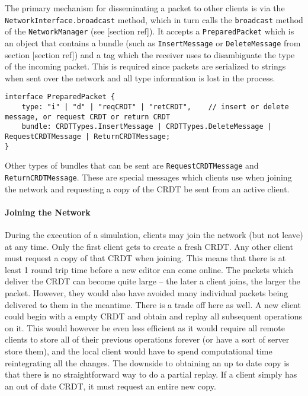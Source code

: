 \documentclass[12pt,a4paper,twoside,openright]{report}
\begin{document}
		The primary mechanism for disseminating a packet to other clients is via the \lstinline|NetworkInterface.broadcast| method, which in turn calls the \lstinline|broadcast| method of the \lstinline|NetworkManager| (see [section ref]). It accepts a \lstinline|PreparedPacket| which is an object that contains a bundle (such as \lstinline|InsertMessage| or \lstinline|DeleteMessage| from section [section ref]) and a tag which the receiver uses to disambiguate the type of the incoming packet. This is required since packets are serialized to strings when sent over the network and all type information is lost in the process.
\begin{lstlisting}	
interface PreparedPacket {
	type: "i" | "d" | "reqCRDT" | "retCRDT",    // insert or delete message, or request CRDT or return CRDT
	bundle: CRDTTypes.InsertMessage | CRDTTypes.DeleteMessage | RequestCRDTMessage | ReturnCRDTMessage;
}
\end{lstlisting}
		
		Other types of bundles that can be sent are \lstinline|RequestCRDTMessage| and \lstinline|ReturnCRDTMessage|. These are special messages which clients use when joining the network and requesting a copy of the CRDT be sent from an active client.
		
		\paragraph{Joining the Network}
		During the execution of a simulation, clients may join the network (but not leave) at any time. Only the first client gets to create a fresh CRDT. Any other client must request a copy of that CRDT when joining. This means that there is at least 1 round trip time before a new editor can come online. The packets which deliver the CRDT can become quite large -- the later a client joins, the larger the packet. However, they would also have avoided many individual packets being delivered to them in the meantime. There is a trade off here as well. A new client could begin with a empty CRDT and obtain and replay all subsequent operations on it. This would however be even less efficient as it would require all remote clients to store all of their previous operations forever (or have a sort of server store them), and the local client would have to spend computational time reintegrating all the changes. The downside to obtaining an up to date copy is that there is no straightforward way to do a partial replay. If a client simply has an out of date CRDT, it must request an entire new copy.
		
\end{document}
